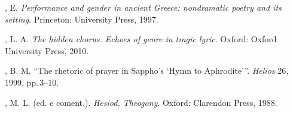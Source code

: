 \begin{bibliohedra}
, E. \emph{Performance and gender in ancient Greece: nondramatic poetry and its setting}. Princeton: University Press, 1997.

, L. A. \emph{The hidden chorus. Echoes of genre in tragic lyric}. Oxford: Oxford University Press, 2010.

\enlargethispage{2\baselineskip}
, B. M. “The rhetoric of prayer in Sappho's `Hymn to Aphrodite'”. \emph{Helios} 26, 1999, pp.\,3--10.

, M. L. (ed. e coment.). \emph{Hesiod, Theogony}. Oxford: Clarendon Press, 1988.


\end{bibliohedra}

